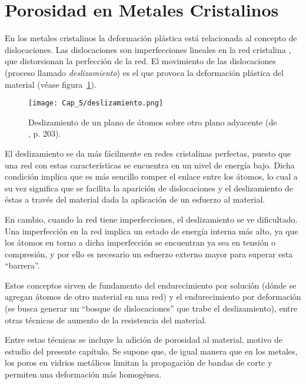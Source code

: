 
\section{Porosidad en Metales Cristalinos}
\label{S5_2}

En los metales cristalinos la deformación plástica está relacionada al concepto de dislocaciones. Las dislocaciones son imperfecciones lineales en
la red cristalina \citep{askeland98}, que distorsionan la perfección de la red. El movimiento de las dislocaciones (proceso llamado
\textit{deslizamiento}) es el que provoca la deformación plástica del material (véase figura~\ref{C5:fg:dislocaciones}).

\begin{figure}[h!]
\centering
  \texttt{[image: Cap\_5/deslizamiento.png]}
  \caption[Deslizamiento de un plano de átomos sobre otro plano adyacente]{Deslizamiento de un plano de átomos sobre otro plano adyacente
  (de \cite{shackelford04}, p. 203).}
  \label{C5:fg:dislocaciones}
\end{figure}

El deslizamiento se da más fácilmente en redes cristalinas perfectas, puesto que una red con estas características se encuentra en un nivel
de energía bajo. Dicha condición implica que es más sencillo romper el enlace entre los átomos, lo cual a su vez significa que se facilita
la aparición de dislocaciones y el deslizamiento de éstas a través del material dada la aplicación de un esfuerzo al material.

En cambio, cuando la red tiene imperfecciones, el deslizamiento se ve dificultado. Una imperfección en la red implica un estado de energía
interna más alto, ya que los átomos en torno a dicha imperfección se encuentran ya sea en tensión o compresión, y por ello es necesario un
esfuerzo externo mayor para superar esta ``barrera''.

Estos conceptos sirven de fundamento del endurecimiento por solución (dónde se agregan átomos de otro material en una red) y el endurecimiento
por deformación (se busca generar un ``bosque de dislocaciones'' que trabe el deslizamiento), entre otras técnicas de aumento de la resistencia
del material. 

Entre estas técnicas se incluye la adición de porosidad al material, motivo de estudio del presente capítulo. Se supone que, de igual manera
que en los metales, los poros en vidrios metálicos limitan la propagación de bandas de corte y permiten
una deformación más homogénea.

